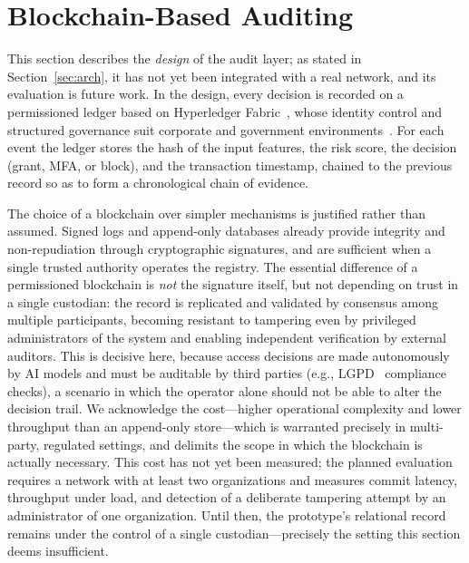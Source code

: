 \documentclass[conference]{IEEEtran}
\begin{document}
\section{Blockchain-Based Auditing}
\label{sec:bc}
This section describes the \emph{design} of the audit layer; as stated
in Section~\ref{sec:arch}, it has not yet been integrated with a real
network, and its evaluation is future work. In the design, every decision
is recorded on a permissioned ledger based on
Hyperledger Fabric~\cite{fabric2024}, whose identity control and
structured governance suit corporate and government
environments~\cite{nistir8202}. For each event the ledger stores the
hash of the input features, the risk score, the decision (grant, MFA,
or block), and the transaction timestamp, chained to the previous
record so as to form a chronological chain of evidence.

The choice of a blockchain over simpler mechanisms is justified rather
than assumed. Signed logs and append-only databases already provide
integrity and non-repudiation through cryptographic signatures, and are
sufficient when a single trusted authority operates the registry. The
essential difference of a permissioned blockchain is \emph{not} the
signature itself, but not depending on trust in a single custodian: the
record is replicated and validated by consensus among multiple
participants, becoming resistant to tampering even by privileged
administrators of the system and enabling independent verification by
external auditors. This is decisive here, because access decisions are
made autonomously by AI models and must be auditable by third parties
(e.g., LGPD~\cite{lgpd2018} compliance checks), a scenario in which the
operator alone should not be able to alter the decision trail. We
acknowledge the cost---higher operational complexity and lower
throughput than an append-only store---which is warranted precisely in
multi-party, regulated settings, and delimits the scope in which the
blockchain is actually necessary. This cost has not yet been measured;
the planned evaluation requires a network with at least two
organizations and measures commit latency, throughput under load, and
detection of a deliberate tampering attempt by an administrator of one
organization. Until then, the prototype's relational record remains
under the control of a single custodian---precisely the setting this
section deems insufficient.
\end{document}
